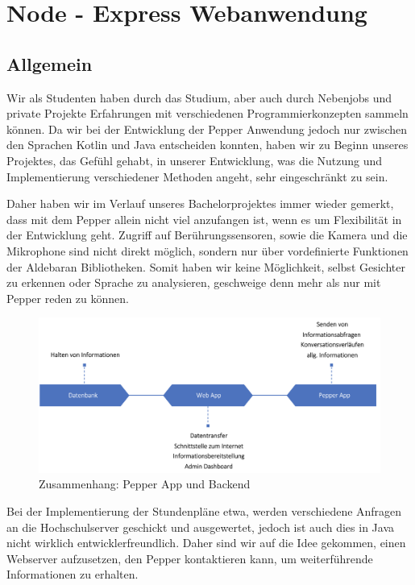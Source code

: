 \chapter{Node - Express Webanwendung}
\label{sec:nodechapter}

\section{Allgemein}
\label{sec:nodechapter-general}
Wir als Studenten haben durch das Studium, aber auch durch Nebenjobs und private Projekte Erfahrungen
mit verschiedenen Programmierkonzepten sammeln können. Da wir bei der Entwicklung der Pepper Anwendung
jedoch nur zwischen den Sprachen Kotlin und Java entscheiden konnten, haben wir zu Beginn unseres Projektes,
das Gefühl gehabt, in unserer Entwicklung, was die Nutzung und Implementierung verschiedener
Methoden angeht, sehr eingeschränkt zu sein.

Daher haben wir im Verlauf unseres Bachelorprojektes immer wieder gemerkt, dass mit dem Pepper allein nicht viel anzufangen
ist, wenn es um Flexibilität in der Entwicklung geht. Zugriff auf Berührungssensoren, sowie die Kamera und die Mikrophone
sind nicht direkt möglich, sondern nur über vordefinierte Funktionen der Aldebaran Bibliotheken. Somit haben
wir keine Möglichkeit, selbst Gesichter zu erkennen oder Sprache zu analysieren, geschweige denn mehr als nur mit Pepper
reden zu können.

\begin{figure}[H]
    \includegraphics[width=\textwidth]{Figures/NodeChapter/integration.png}
    \caption{Zusammenhang: Pepper App und Backend}
    \label{fig:integration}
    \centering
\end{figure}

Bei der Implementierung der Stundenpläne etwa, werden verschiedene Anfragen an die Hochschulserver geschickt und ausgewertet,
jedoch ist auch dies in Java nicht wirklich entwicklerfreundlich. Daher sind wir auf die Idee gekommen,
einen Webserver aufzusetzen, den Pepper kontaktieren kann, um weiterführende Informationen zu erhalten.


